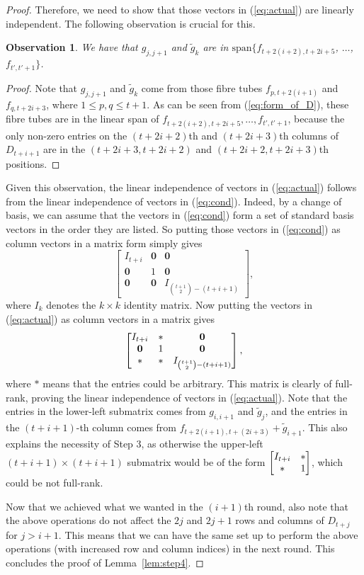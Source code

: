 \documentclass[10pt]{article}
\newtheorem{observation}[theorem]{Observation}
\newcommand{\tuple}[1]{\mathbf{#1}}
\renewcommand{\span}{\mathrm{span}}
\newcommand{\vzero}{\tuple{0}}
\begin{document}
\begin{proof}
Therefore, we need to show that those 
vectors in (\ref{eq:actual}) are linearly independent. The following 
observation is crucial for this. 
\begin{observation}\label{obs:key}
We have that $g_{j, j+1}$ and $\tilde 
g_k$ are in $\span\{f_{t+2(i+2), t+2i+5}$, $\dots$, $f_{t', t'+1}\}$. 
\end{observation}
\begin{proof}
Note that $g_{j, j+1}$ and $\tilde g_k$ come from those fibre tubes $f_{p, 
t+2(i+1)}$ and $f_{q, t+2i+3}$, where $1\leq p, q\leq t+1$. As can be seen from 
(\ref{eq:form_of_D}), 
these fibre tubes are in the linear span of $f_{t+2(i+2), t+2i+5}, \dots, f_{t', 
t'+1}$, because the only non-zero entries on the $(t+2i+2)$th and $(t+2i+3)$th 
columns of $D_{t+i+1}$ are in the $(t+2i+3, t+2i+2)$ and $(t+2i+2, t+2i+3)$th 
positions.
\end{proof}

Given 
this observation, the linear independence of vectors in (\ref{eq:actual})
follows from the linear independence of vectors in (\ref{eq:cond}). Indeed, 
by a change of basis, we can assume that the vectors in (\ref{eq:cond}) 
form a set of standard basis vectors in the order they are listed. So putting 
those vectors in (\ref{eq:cond}) as 
column vectors in  
a matrix form simply gives
$$
\begin{bmatrix}
I_{t+i} & \vzero &\vzero \\
\vzero & 1 & \vzero \\
\vzero & \vzero & I_{\binom{t+1}{2}-(t+i+1)}
\end{bmatrix},
$$
where $I_k$ denotes the $k\times k$ identity 
matrix. Now putting the vectors in (\ref{eq:actual}) as column vectors in a 
matrix gives
$$
\begin{bmatrix}
I_{t+i} & {\bf *} &\vzero \\
\vzero & 1 & \vzero \\
\mathbf{*} & * & I_{\binom{t+1}{2}-(t+i+1)}
\end{bmatrix},
$$
where $\mathbf{*}$ means that the entries could be arbitrary. This matrix is 
clearly of full-rank, proving the linear independence of vectors in 
(\ref{eq:actual}). Note that the 
entries in the lower-left submatrix comes from $g_{i, i+1}$ and $\tilde g_j$, and 
the entries in the $(t+i+1)$-th column comes from $f_{t+2(i+1), t+(2i+3)}+\tilde 
g_{i+1}$. This 
also explains the necessity of Step 3, as otherwise the 
upper-left $(t+i+1)\times(t+i+1)$ submatrix would be of the form
$\begin{bmatrix}
I_{t+i} & {\bf *}\\
{\bf *} & 1
\end{bmatrix}$, which could be not full-rank. 


Now that we achieved what we wanted in the $(i+1)$th round, also note that the 
above operations do not 
affect the $2j$ and $2j+1$ rows and columns of $D_{t+j}$ for $j>i+1$. This means 
that we can have the same set up to perform the above operations (with increased 
row and column indices) in the next round. This concludes the proof of 
Lemma~\ref{lem:step4}.
\end{proof}
\end{document}

